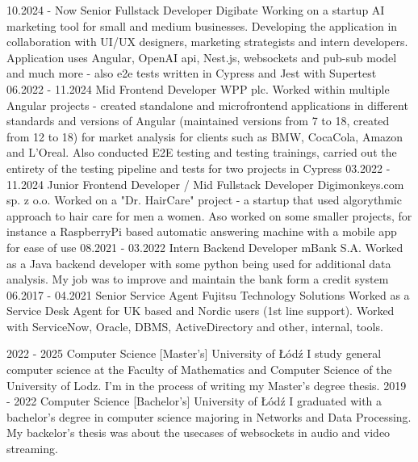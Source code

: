 \documentclass[9pt]{developercv}%
\begin{document}
\begin{entrylist}
	\entry
	{10.2024 - Now}
	{Senior Fullstack Developer}
	{Digibate}
	{Working on a startup AI marketing tool for small and medium businesses. Developing the application in collaboration with UI/UX designers, marketing strategists and intern developers. Application uses Angular, OpenAI api, Nest.js, websockets and pub-sub model and much more - also e2e tests written in Cypress and Jest with Supertest}
	\entry
	{06.2022 - 11.2024}
	{Mid Frontend Developer}
	{WPP plc.}
	{Worked within multiple Angular projects - created standalone and microfrontend applications in different standards and versions of Angular (maintained versions from 7 to 18, created from 12 to 18) for market analysis for clients such as BMW, CocaCola, Amazon and L'Oreal. Also conducted E2E testing and testing trainings, carried out the entirety of the testing pipeline and tests for two projects in Cypress}
	\entry
	{03.2022 - 11.2024}
	{Junior Frontend Developer / Mid Fullstack Developer}
	{Digimonkeys.com sp. z o.o.}
	{Worked on a "Dr. HairCare" project - a startup that used algorythmic approach to hair care for men a women. Aso worked on some smaller projects, for instance a RaspberryPi based automatic answering machine with a mobile app for ease of use}
	\entry
	{08.2021 - 03.2022}
	{Intern Backend Developer}
	{mBank S.A.}
	{Worked as a Java backend developer with some python being used for additional data analysis. My job was to improve and maintain the bank form a credit system}
	\entry
	{06.2017 - 04.2021}
	{Senior Service Agent}
	{Fujitsu Technology Solutions}
	{Worked as a Service Desk Agent for UK based and Nordic users (1st line support). Worked with ServiceNow, Oracle, DBMS, ActiveDirectory and other, internal, tools.}
\end{entrylist}

\clearpage


\begin{entrylist}
	\entry
	{2022 - 2025}
	{Computer Science [Master's]}
	{University of Łódź}
	{I study general computer science at the Faculty of Mathematics and Computer Science of the University of Lodz. I'm in the process of writing my Master's degree thesis.}
	\entry
	{2019 - 2022}
	{Computer Science [Bachelor's]}
	{University of Łódź}
	{I graduated with a bachelor's degree in computer science majoring in Networks and Data Processing. My backelor's thesis was about the usecases of websockets in audio and video streaming.}
\end{entrylist}
\end{document}
